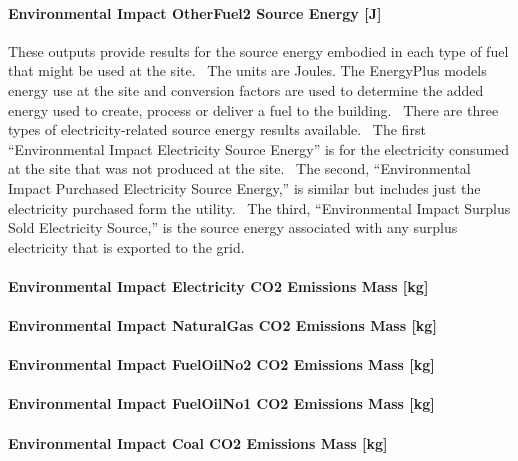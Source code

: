 \paragraph{Environmental Impact OtherFuel2 Source Energy {[}J{]}}\label{environmental-impact-otherfuel2-source-energy-j}

These outputs provide results for the source energy embodied in each type of fuel that might be used at the site.~ The units are Joules. The EnergyPlus models energy use at the site and conversion factors are used to determine the added energy used to create, process or deliver a fuel to the building.~ There are three types of electricity-related source energy results available.~ The first ``Environmental Impact Electricity Source Energy'' is for the electricity consumed at the site that was not produced at the site.~ The second, ``Environmental Impact Purchased Electricity Source Energy,'' is similar but includes just the electricity purchased form the utility.~ The third, ``Environmental Impact Surplus Sold Electricity Source,'' is the source energy associated with any surplus electricity that is exported to the grid.

\paragraph{Environmental Impact Electricity CO2 Emissions Mass {[}kg{]}}\label{environmental-impact-electricity-co2-emissions-mass-kg}

\paragraph{Environmental Impact NaturalGas CO2 Emissions Mass {[}kg{]}}\label{environmental-impact-natural-gas-co2-emissions-mass-kg}

\paragraph{Environmental Impact FuelOilNo2 CO2 Emissions Mass {[}kg{]}}\label{environmental-impact-fuel-oil-2-co2-emissions-mass-kg}

\paragraph{Environmental Impact FuelOilNo1 CO2 Emissions Mass {[}kg{]}}\label{environmental-impact-fuel-oil-1-co2-emissions-mass-kg}

\paragraph{Environmental Impact Coal CO2 Emissions Mass {[}kg{]}}\label{environmental-impact-coal-co2-emissions-mass-kg}

